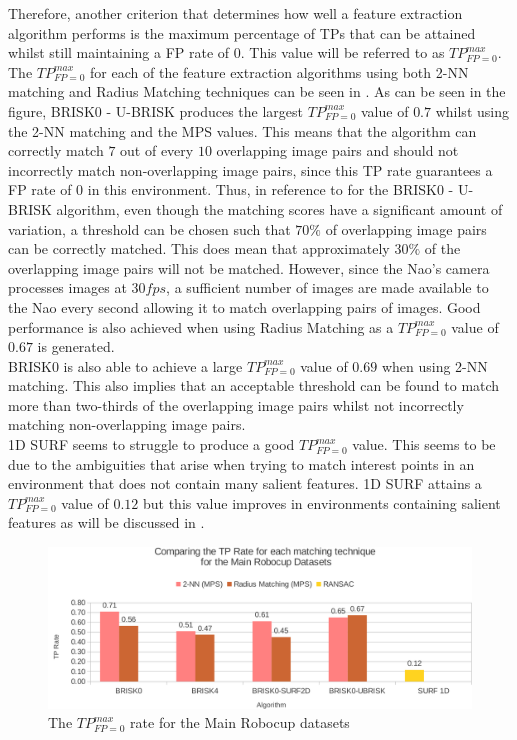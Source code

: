 \documentclass[11pt]{report}
\begin{document}
Therefore, another criterion that determines how well a feature extraction algorithm performs is the maximum percentage of TPs that can be attained whilst still maintaining a FP rate of $0$. This value will be referred to as $TP_{FP=0}^{max}$.  \\

The $TP_{FP=0}^{max}$ for each of the feature extraction algorithms using both 2-NN matching and Radius Matching techniques can be seen in . As can be seen in the figure, BRISK0 - U-BRISK produces the largest $TP_{FP=0}^{max}$ value of $0.7$ whilst using the 2-NN matching and the MPS values. This means that the algorithm can correctly match $7$ out of every $10$ overlapping image pairs and should not incorrectly match non-overlapping image pairs, since this TP rate guarantees a FP rate of $0$ in this environment. Thus, in reference to  for the BRISK0 - U-BRISK algorithm, even though the matching scores have a significant amount of variation, a threshold can be chosen such that $70\%$ of overlapping image pairs can be correctly matched. This does mean that approximately $30\%$ of the overlapping image pairs will not be matched. However, since the Nao's camera processes images at $30 fps$, a sufficient number of images are made available to the Nao every second allowing it to match overlapping pairs of images. Good performance is also achieved when using Radius Matching as a $TP_{FP=0}^{max}$ value of $0.67$ is generated.\\ 

BRISK0 is also able to achieve a large $TP_{FP=0}^{max}$ value of $0.69$ when using 2-NN matching. This also implies that an acceptable threshold can be found to match more than two-thirds of the overlapping image pairs whilst not incorrectly matching non-overlapping image pairs.\\

1D SURF seems to struggle to produce a good $TP_{FP=0}^{max}$ value. This seems to be due to the ambiguities that arise when trying to match interest points in an environment that does not contain many salient features. 1D SURF attains a $TP_{FP=0}^{max}$ value of $0.12$ but this value improves in environments containing salient features as will be discussed in .\\

\begin{figure}
  \centering
    \includegraphics[width=1.0\textwidth]{../Drawings/Graphs/tp_rate_mrb.pdf}
    \caption{The $TP_{FP=0}^{max}$ rate for the Main Robocup datasets} 
    \label{fig:tp_rate_mrd}
\end{figure}
\end{document}
